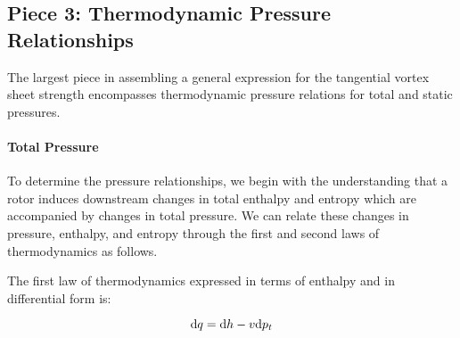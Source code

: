 %
%



\subsection{Piece 3: Thermodynamic Pressure Relationships}
\label{ssec:pressure}

The largest piece in assembling a general expression for the tangential vortex sheet strength encompasses thermodynamic pressure relations for total and static pressures.

\paragraph{Total Pressure}


To determine the pressure relationships, we begin with the understanding that a rotor induces downstream changes in total enthalpy and entropy which are accompanied by changes in total pressure.
%
We can relate these changes in pressure, enthalpy, and entropy through the first and second laws of thermodynamics as follows.


The first law of thermodynamics expressed in terms of enthalpy and in differential form is:

\begin{equation}
    \label{eqn:firstlaw}
    \mathrm{d} q = \mathrm{d} h - v\mathrm{d} p_t
\end{equation}

